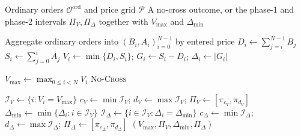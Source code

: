 \begin{algorithm}[p]
\caption{Determining the clearing-price interval}
\label{alg:price-interval}
\scriptsize
\begin{algorithmic}[1]
\Require Ordinary orders $\mathcal{O}^{\mathrm{ord}}$ and price grid
    $\mathcal{P}$
\Ensure A no-cross outcome, or the phase-1 and phase-2 intervals
    $\Pi_V,\Pi_\Delta$ together with $V_{\max}$ and $\Delta_{\min}$

\State Aggregate ordinary orders into $(B_i,A_i)_{i=0}^{N-1}$ by entered price
    \label{line:close-aggregate}
    \State $D_i\gets\sum_{j=i}^{N-1}B_j$
        \label{line:close-demand}
    \State $S_i\gets\sum_{j=0}^{i}A_j$
        \label{line:close-supply}
    \State $V_i\gets\min\{D_i,S_i\}$;
        $G_i\gets S_i-D_i$;
        $\Delta_i\gets|G_i|$
        \label{line:close-point-values}
\EndFor

\State $V_{\max}\gets\max_{0\leq i<N}V_i$
    \label{line:close-vmax}
    \State \Return \textsc{No-Cross}
        \label{line:close-no-cross}
\EndIf

\State $\mathcal{I}_V\gets\{i:V_i=V_{\max}\}$
    \label{line:close-plateau}
\State $c_V\gets\min\mathcal{I}_V$;
    $d_V\gets\max\mathcal{I}_V$;
    $\Pi_V\gets[\pi_{c_V},\pi_{d_V}]$
    \label{line:close-volume-interval}
\State $\Delta_{\min}\gets\min\{\Delta_i:i\in\mathcal{I}_V\}$
    \label{line:close-delta-min}
\State $\mathcal{I}_{\Delta}\gets
    \{i\in\mathcal{I}_V:\Delta_i=\Delta_{\min}\}$
\State $c_\Delta\gets\min\mathcal{I}_\Delta$;
    $d_\Delta\gets\max\mathcal{I}_\Delta$;
    $\Pi_\Delta\gets[\pi_{c_\Delta},\pi_{d_\Delta}]$
    \label{line:close-imbalance-interval}
\State \Return $(V_{\max},\Pi_V,\Delta_{\min},\Pi_\Delta)$
    \label{line:close-interval-return}
\end{algorithmic}
\end{algorithm}

